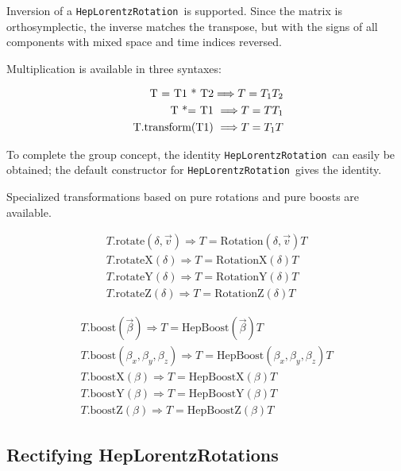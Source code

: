 \documentclass[twoside,12pt]{article}
\def \LT {{\tt HepLorentzRotation}}
\begin{document}
Inversion of a \LT\ is supported.  Since the matrix is orthosymplectic,
the inverse matches the transpose, but with the signs of all components
with mixed space and time indices reversed.

Multiplication is available in three syntaxes:

\begin{eqnarray}
	\mbox{ T = T1 * T2} \Longrightarrow {\boldmath T = T_1 T_2}
	\\
	\mbox{ T *= T1 } \Longrightarrow {\boldmath T = T T_1 }
	\\
\label{eq:lttrans}
	\mbox{ T.transform(T1) } \Longrightarrow {\boldmath T = T_1 T }
\end{eqnarray}

To complete the group concept, the identity \LT\ can easily be obtained; the
default constructor for \LT\ gives the identity.

Specialized transformations based on pure rotations and pure boosts 
are available.  

\begin{eqnarray}
\label{eq:ltrot}
  T\mbox{.rotate}(\delta, \vec{v}) \Longrightarrow T = 
		\mbox{Rotation}(\delta, \vec{v}) T \\
\nonumber
  T\mbox{.rotateX}(\delta) \Longrightarrow T = \mbox{RotationX}(\delta) T \\
\nonumber
  T\mbox{.rotateY}(\delta) \Longrightarrow T = \mbox{RotationY}(\delta) T \\
\nonumber
  T\mbox{.rotateZ}(\delta) \Longrightarrow T = \mbox{RotationZ}(\delta) T 
\end{eqnarray}

\begin{eqnarray}
\label{eq:ltboost}
  T\mbox{.boost}(\vec{\beta}) \Longrightarrow T = 
		\mbox{HepBoost}(\vec{\beta}) T \\
\nonumber
  T\mbox{.boost}(\beta_x, \beta_y, \beta_z) \Longrightarrow T = 
		\mbox{HepBoost}(\beta_x, \beta_y, \beta_z) T \\
\nonumber
  T\mbox{.boostX}(\beta) \Longrightarrow T = \mbox{HepBoostX}(\beta) T \\
\nonumber
  T\mbox{.boostY}(\beta) \Longrightarrow T = \mbox{HepBoostY}(\beta) T \\
\nonumber
  T\mbox{.boostZ}(\beta) \Longrightarrow T = \mbox{HepBoostZ}(\beta) T 
\end{eqnarray}


\subsection{Rectifying HepLorentzRotations}
\end{document}

